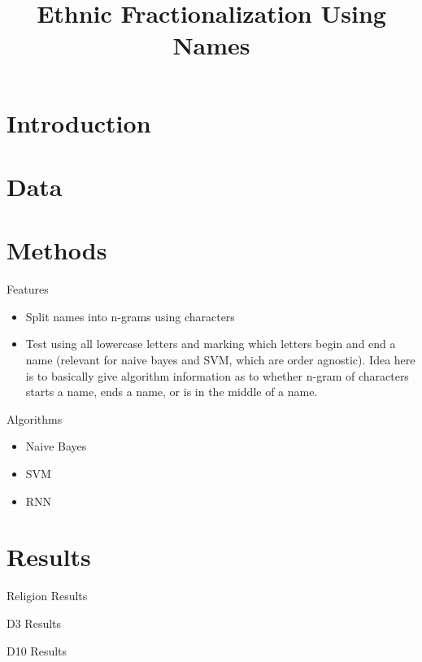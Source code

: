 \documentclass[11pt, oneside]{article}
\title{Ethnic Fractionalization Using Names}
\author{}
\date{}
\begin{document}
\maketitle

\section{Introduction}

\section{Data}

\section{Methods}

\noindent Features
\begin{itemize}
\item Split names into n-grams using characters
\item Test using all lowercase letters and marking which letters begin and end a name (relevant for naive bayes and SVM, which are order agnostic). Idea here is to basically give algorithm information as to whether n-gram of characters starts a name, ends a name, or is in the middle of a name.
\end{itemize}

\noindent Algorithms
\begin{itemize}
\item Naive Bayes
\item SVM
\item RNN
\end{itemize}

\section{Results}

\setlength{\tabcolsep}{10pt}
\begin{table}[H]
\caption{Religion Results}
\centering

\end{table}

\setlength{\tabcolsep}{10pt}
\begin{table}[H]
\caption{D3 Results}
\centering
\begin{adjustbox}{width=1\textwidth}

\end{adjustbox}
\end{table}

\setlength{\tabcolsep}{10pt}
\begin{table}[H]
\caption{D10 Results}
\centering
\begin{adjustbox}{width=1\textwidth}

\end{adjustbox}
\end{table}

\end{document}
